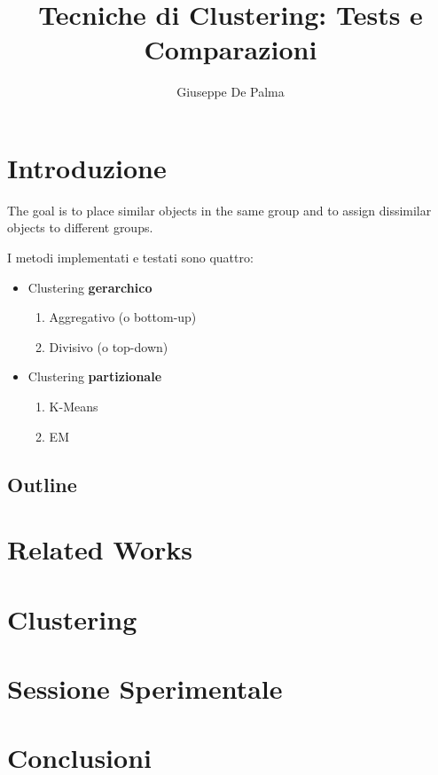\documentclass[12pt]{article}
\title{Tecniche di Clustering: Tests e Comparazioni}
\author{Giuseppe De Palma}
\date{}
\begin{document}
    \maketitle
	   
	\section{Introduzione}
	The goal is to place similar objects in the same group and to assign dissimilar objects to different groups.
	
	I metodi implementati e testati sono quattro:
	\begin{itemize}
		\item Clustering \textbf{gerarchico}
		\begin{enumerate}
			\item Aggregativo (o bottom-up)
			\item Divisivo (o top-down)
		\end{enumerate}

		\item Clustering \textbf{partizionale}
		\begin{enumerate}
			\item K-Means
			\item EM
		\end{enumerate}
	\end{itemize}
    \subsection{Outline}
    \section{Related Works}
    \section{Clustering}
    \section{Sessione Sperimentale}
    \section{Conclusioni}
    
\end{document}
